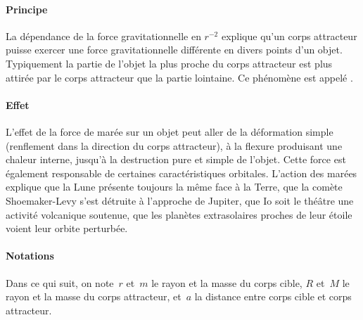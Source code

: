 \sk
\paragraph{Principe} La dépendance de la force gravitationnelle en $r^{-2}$ explique qu'un corps attracteur puisse exercer une force gravitationnelle différente en divers points d'un objet. Typiquement la partie de l'objet la plus proche du corps attracteur est plus attirée par le corps attracteur que la partie lointaine. Ce phénomène est appelé . 

\sk
\paragraph{Effet} L'effet de la force de marée sur un objet peut aller de la déformation simple (renflement dans la direction du corps attracteur), à la flexure produisant une chaleur interne, jusqu'à la destruction pure et simple de l'objet. Cette force est également responsable de certaines caractéristiques orbitales. L'action des marées explique que la Lune présente toujours la même face à la Terre, que la comète Shoemaker-Levy s'est détruite à l'approche de Jupiter, que Io soit le théâtre une activité volcanique soutenue, que les planètes extrasolaires proches de leur étoile voient leur orbite perturbée.  

\sk
\paragraph{Notations} Dans ce qui suit, on note~$r$ et~$m$ le rayon et la masse du corps cible, $R$ et~$M$ le rayon et la masse du corps attracteur, et~$a$ la distance entre corps cible et corps attracteur.












